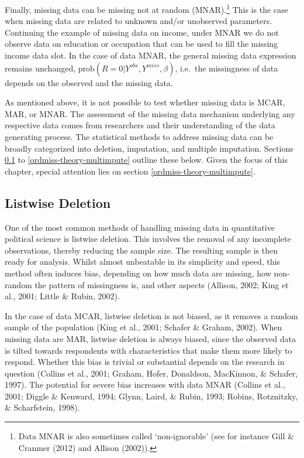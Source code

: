 \documentclass[12pt,econ]{sources/authesis}
\begin{document}
Finally, missing data can be missing not at random (MNAR).\footnote{Data MNAR is also sometimes called `non-ignorable' (see for instance Gill \& Cranmer (2012) and Allison (2002)).} This is the case when missing data are related to unknown and/or unobserved parameters. Continuing the example of missing data on income, under MNAR we do not observe data on education or occupation that can be used to fill the missing income data slot. In the case of data MNAR, the general missing data expression remains unchanged, \(\text{prob}(R = 0 | Y^{obs}, Y^{miss}, \beta)\), i.e.~the missingness of data depends on the observed and the missing data.

As mentioned above, it is not possible to test whether missing data is MCAR, MAR, or MNAR. The assessment of the missing data mechanism underlying any respective data comes from researchers and their understanding of the data generating process. The statistical methods to address missing data can be broadly categorized into deletion, imputation, and multiple imputation. Sections \ref{ordmiss-theory-delete} to \ref{ordmiss-theory-multimpute} outline these below. Given the focus of this chapter, special attention lies on section \ref{ordmiss-theory-multimpute}.

\hypertarget{ordmiss-theory-delete}{%
\subsection{Listwise Deletion}\label{ordmiss-theory-delete}}

One of the most common methods of handling missing data in quantitative political science is listwise deletion. This involves the removal of any incomplete observations, thereby reducing the sample size. The resulting sample is then ready for analysis. Whilst almost unbeatable in its simplicity and speed, this method often induces bias, depending on how much data are missing, how non-random the pattern of missingness is, and other aspects (Allison, 2002; King et al., 2001; Little \& Rubin, 2002).

In the case of data MCAR, listwise deletion is not biased, as it removes a random sample of the population (King et al., 2001; Schafer \& Graham, 2002). When missing data are MAR, listwise deletion is always biased, since the observed data is tilted towards respondents with characteristics that make them more likely to respond. Whether this bias is trivial or substantial depends on the research in question (Collins et al., 2001; Graham, Hofer, Donaldson, MacKinnon, \& Schafer, 1997). The potential for severe bias increases with data MNAR (Collins et al., 2001; Diggle \& Kenward, 1994; Glynn, Laird, \& Rubin, 1993; Robins, Rotznitzky, \& Scharfstein, 1998).
\end{document}

